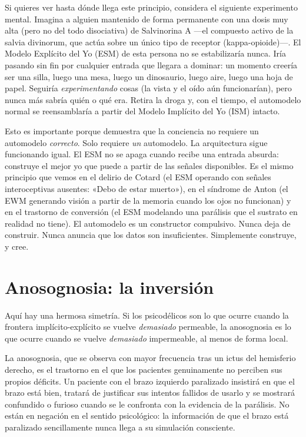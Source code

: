 \documentclass[11pt, twoside, openright]{book}
\begin{document}
Si quieres ver hasta dónde llega este principio, considera el siguiente experimento mental. Imagina a alguien mantenido de forma permanente con una dosis muy alta (pero no del todo disociativa) de Salvinorina A ---el compuesto activo de la salvia divinorum, que actúa sobre un único tipo de receptor (kappa-opioide)---. El Modelo Explícito del Yo (ESM) de esta persona no se estabilizaría nunca. Iría pasando sin fin por cualquier entrada que llegara a dominar: un momento creería ser una silla, luego una mesa, luego un dinosaurio, luego aire, luego una hoja de papel. Seguiría \textit{experimentando} cosas (la vista y el oído aún funcionarían), pero nunca más sabría quién o qué era. Retira la droga y, con el tiempo, el automodelo normal se reensamblaría a partir del Modelo Implícito del Yo (ISM) intacto.

Esto es importante porque demuestra que la conciencia no requiere un automodelo \textit{correcto}. Solo requiere \textit{un} automodelo. La arquitectura sigue funcionando igual. El ESM no se apaga cuando recibe una entrada absurda: construye el mejor yo que puede a partir de las señales disponibles. Es el mismo principio que vemos en el delirio de Cotard (el ESM operando con señales interoceptivas ausentes: «Debo de estar muerto»), en el síndrome de Anton (el EWM generando visión a partir de la memoria cuando los ojos no funcionan) y en el trastorno de conversión (el ESM modelando una parálisis que el sustrato en realidad no tiene). El automodelo es un constructor compulsivo. Nunca deja de construir. Nunca anuncia que los datos son insuficientes. Simplemente construye, y cree.

\section*{Anosognosia: la inversión}

Aquí hay una hermosa simetría. Si los psicodélicos son lo que ocurre cuando la frontera implícito-explícito se vuelve \textit{demasiado} permeable, la anosognosia es lo que ocurre cuando se vuelve \textit{demasiado} impermeable, al menos de forma local.

La anosognosia, que se observa con mayor frecuencia tras un ictus del hemisferio derecho, es el trastorno en el que los pacientes genuinamente no perciben sus propios déficits. Un paciente con el brazo izquierdo paralizado insistirá en que el brazo está bien, tratará de justificar sus intentos fallidos de usarlo y se mostrará confundido o furioso cuando se le confronta con la evidencia de la parálisis. No están en negación en el sentido psicológico: la información de que el brazo está paralizado sencillamente nunca llega a su simulación consciente.
\end{document}
